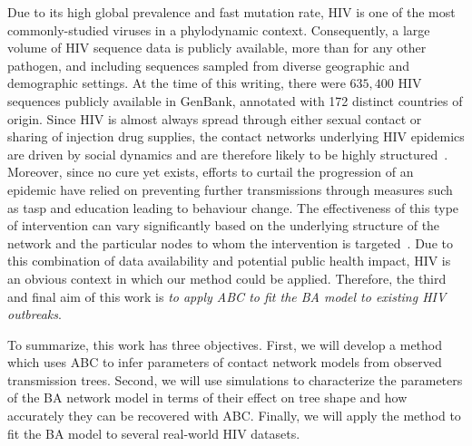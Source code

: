 Due to its high global prevalence and fast mutation rate, \gls{HIV} is one of
the most commonly-studied viruses in a phylodynamic context. Consequently, a
large volume of \gls{HIV} sequence data is publicly available, more than for
any other pathogen, and including sequences sampled from diverse geographic and
demographic settings. At the time of this writing, there were $635,400$ HIV
sequences publicly available in GenBank, annotated with 172 distinct countries
of origin. Since \gls{HIV} is almost always spread through either sexual
contact or sharing of injection drug supplies, the contact networks underlying
\gls{HIV} epidemics are driven by social dynamics and are therefore likely to
be highly structured~\autocite{clemenccon2015statistical}. Moreover, since no
cure yet exists, efforts to curtail the progression of an epidemic have relied
on preventing further transmissions through measures such as \gls{tasp} and
education leading to behaviour change. The effectiveness of this type of
intervention can vary significantly based on the underlying structure of the
network and the particular nodes to whom the intervention is
targeted~\autocite{little2014using,wang2015targeting}. Due to this combination
of data availability and potential public health impact, \gls{HIV} is an
obvious context in which our method could be applied. Therefore, the third and
final aim of this work is \emph{to apply \gls{ABC} to fit the \acrlong{BA}
model to existing \gls{HIV} outbreaks}.

To summarize, this work has three objectives. First, we will develop a method
which uses \gls{ABC} to infer parameters of contact network models from
observed transmission trees. Second, we will use simulations to characterize
the parameters of the \gls{BA} network model in terms of their effect on tree
shape and how accurately they can be recovered with \gls{ABC}. Finally, we will
apply the method to fit the \gls{BA} model to several real-world \gls{HIV}
datasets.


